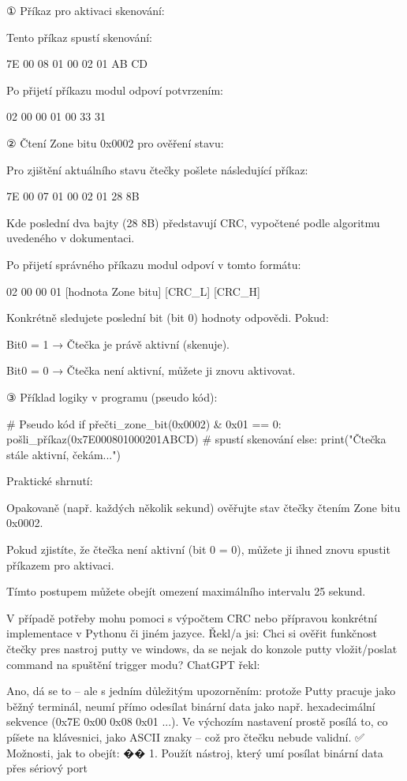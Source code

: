 ① Příkaz pro aktivaci skenování:

Tento příkaz spustí skenování:

7E 00 08 01 00 02 01 AB CD

Po přijetí příkazu modul odpoví potvrzením:

02 00 00 01 00 33 31

② Čtení Zone bitu 0x0002 pro ověření stavu:

Pro zjištění aktuálního stavu čtečky pošlete následující příkaz:

7E 00 07 01 00 02 01 28 8B

Kde poslední dva bajty (28 8B) představují CRC, vypočtené podle algoritmu uvedeného v dokumentaci.

Po přijetí správného příkazu modul odpoví v tomto formátu:

02 00 00 01 [hodnota Zone bitu] [CRC_L] [CRC_H]

Konkrétně sledujete poslední bit (bit 0) hodnoty odpovědi. Pokud:

    Bit0 = 1 → Čtečka je právě aktivní (skenuje).

    Bit0 = 0 → Čtečka není aktivní, můžete ji znovu aktivovat.

③ Příklad logiky v programu (pseudo kód):

# Pseudo kód
if přečti_zone_bit(0x0002) & 0x01 == 0:
    pošli_příkaz(0x7E000801000201ABCD) # spustí skenování
else:
    print("Čtečka stále aktivní, čekám...")

Praktické shrnutí:

    Opakovaně (např. každých několik sekund) ověřujte stav čtečky čtením Zone bitu 0x0002.

    Pokud zjistíte, že čtečka není aktivní (bit 0 = 0), můžete ji ihned znovu spustit příkazem pro aktivaci.

    Tímto postupem můžete obejít omezení maximálního intervalu 25 sekund.

V případě potřeby mohu pomoci s výpočtem CRC nebo přípravou konkrétní implementace v Pythonu či jiném jazyce.
Řekl/a jsi:
Chci si ověřit funkčnost čtečky pres nastroj putty ve windows, da se nejak do konzole putty vložit/poslat command na spuštění trigger modu?
ChatGPT řekl:

Ano, dá se to – ale s jedním důležitým upozorněním: protože Putty pracuje jako běžný terminál, neumí přímo odesílat binární data jako např. hexadecimální sekvence (0x7E 0x00 0x08 0x01 ...). Ve výchozím nastavení prostě posílá to, co píšete na klávesnici, jako ASCII znaky – což pro čtečku nebude validní.
✅ Možnosti, jak to obejít:
�� 1. Použít nástroj, který umí posílat binární data přes sériový port

